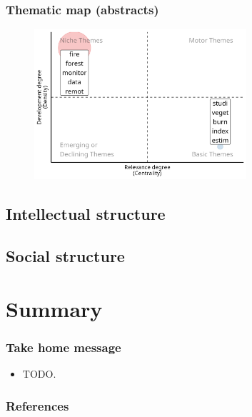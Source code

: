 \documentclass[aspectratio=169]{beamer}
\begin{document}
\begin{frame}
	\frametitle{Thematic map (abstracts)}
	\begin{figure}
		\centering
		\includegraphics[width=0.7\textwidth]{figures/thematic_map_abstracts.png}
	\end{figure}
\end{frame}



\subsection{Intellectual structure}
\subsection{Social structure}



\section{Summary}

\begin{frame}
	\frametitle{Take home message}
	\begin{itemize}
		\item TODO.
	\end{itemize}
\end{frame}

\begin{frame}[allowframebreaks]
	\frametitle{References}
	\printbibliography
\end{frame}
\end{document}

